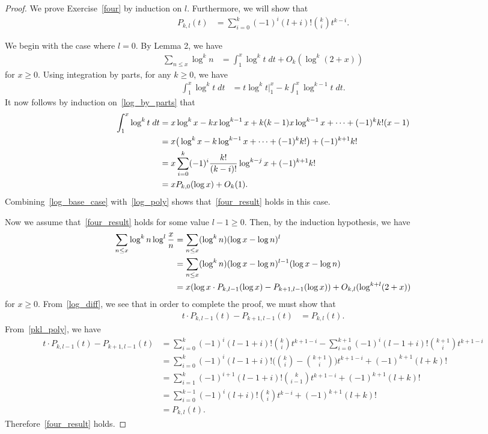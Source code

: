 \documentclass[11pt]{article}
\begin{document}
\begin{proof}
We prove Exercise~\ref{four} by induction on $l$. Furthermore, we will show that
\begin{align}
P_{k,l}(t) &= \sum_{i=0}^k(-1)^i(l+i)!\binom{k}{i}t^{k-i}.\label{pkl_poly}
\end{align}

We begin with the case where $l=0$. By Lemma 2, we have
\begin{align}
\sum_{n\leq x}\log^k{n} &= \int_1^x\log^k{t}\;dt + O_k(\log^k(2+x))\label{log_base_case}
\end{align}
for $x\geq 0$. Using integration by parts, for any $k\geq0$, we have
\begin{align}
\int_1^x\log^k{t}\;dt &= t\log^k{t}\Big\vert_1^x-k\int_1^x\log^{k-1}{t}\;dt.\label{log_by_parts}
\end{align}
It now follows by induction on~\eqref{log_by_parts} that
\begin{align}
\int_1^x\log^k{t}\;dt &= x\log^k{x}-kx\log^{k-1}{x}+k(k-1)x\log^{k-1}{x}+\cdots+(-1)^kk!(x-1)\notag\\
&= x\big(\log^k{x}-k\log^{k-1}{x}+\cdots+(-1)^kk!\big)+(-1)^{k+1}k!\notag\\
&= x\sum_{i=0}^{k}(-1)^i\frac{k!}{(k-i)!}\log^{k-j}{x}+(-1)^{k+1}k!\notag\\
&= xP_{k,0}(\log{x})+O_k(1).\label{log_poly}
\end{align}
Combining~\eqref{log_base_case} with~\eqref{log_poly} shows that~\eqref{four_result} holds in this case.

Now we assume that~\eqref{four_result} holds for some value $l-1\geq 0$. Then, by the induction hypothesis, we have
\begin{align}
\sum_{n\leq x}\log^k{n}\log^l{\frac{x}{n}} &= \sum_{n\leq x}(\log^k{n})(\log{x}-\log{n})^l\notag\\
&= \sum_{n\leq x}(\log^k{n})(\log{x}-\log{n})^{l-1}(\log{x}-\log{n})\notag\\
&= x(\log{x}\cdot P_{k,l-1}(\log{x})-P_{k+1,l-1}(\log{x}))+O_{k,l}(\log^{k+l}(2+x))\label{log_diff}
\end{align}
for $x\geq 0$. From~\eqref{log_diff}, we see that in order to complete the proof, we must show that
\begin{align*}
t\cdot P_{k,l-1}(t)-P_{k+1,l-1}(t) &= P_{k,l}(t).
\end{align*}
From~\eqref{pkl_poly}, we have
\begin{align*}
t\cdot P_{k,l-1}(t)-P_{k+1,l-1}(t) &= \sum_{i=0}^k(-1)^i(l-1+i)!\binom{k}{i}t^{k+1-i}-\sum_{i=0}^{k+1}(-1)^i(l-1+i)!\binom{k+1}{i}t^{k+1-i}\\
&= \sum_{i=0}^k(-1)^i(l-1+i)!\bigg(\binom{k}{i}-\binom{k+1}{i}\bigg)t^{k+1-i}+(-1)^{k+1}(l+k)!\\
&= \sum_{i=1}^k(-1)^{i+1}(l-1+i)!\binom{k}{i-1}t^{k+1-i}+(-1)^{k+1}(l+k)!\\
&= \sum_{i=0}^{k-1}(-1)^i(l+i)!\binom{k}{i}t^{k-i}+(-1)^{k+1}(l+k)!\\
&= P_{k,l}(t).
\end{align*}
Therefore~\eqref{four_result} holds.
\end{proof}
\end{document}
